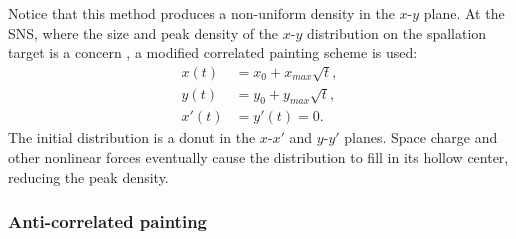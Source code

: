 %
Notice that this method produces a non-uniform density in the $x$-$y$ plane. At the SNS, where the size and peak density of the $x$-$y$ distribution on the spallation target is a concern \cite{Riemer2010}, a modified correlated painting scheme is used:
%
\begin{equation}
\begin{aligned}
    {x}(t) &= x_0 + x_{max}\sqrt{t}, \\
    {y}(t) &= y_0 + y_{max}\sqrt{t}, \\
    x'(t) &= y'(t) = 0.
\end{aligned}
\end{equation}
%
The initial distribution is a donut in the $x$-$x'$ and $y$-$y'$ planes. Space charge and other nonlinear forces eventually cause the distribution to fill in its hollow center, reducing the peak density. 


\subsubsection{Anti-correlated painting}

